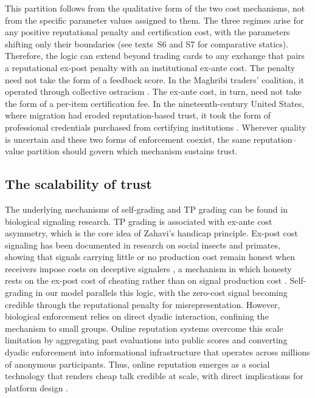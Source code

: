 \documentclass[11pt,letterpaper]{article}
\theoremstyle{definition}
\begin{document}
This partition follows from the qualitative form of the two cost mechanisms, not from the specific parameter values assigned to them. The three regimes arise for any positive reputational penalty and certification cost, with the parameters shifting only their boundaries (see texts~S6 and S7 for comparative statics). Therefore, the logic can extend beyond trading cards to any exchange that pairs a reputational ex-post penalty with an institutional ex-ante cost. The penalty need not take the form of a feedback score. In the Maghribi traders' coalition, it operated through collective ostracism \citep{Greif1993, Greif1994}. The ex-ante cost, in turn, need not take the form of a per-item certification fee. In the nineteenth-century United States, where migration had eroded reputation-based trust, it took the form of professional credentials purchased from certifying institutions \citep{Zucker1986}. Wherever quality is uncertain and these two forms of enforcement coexist, the same reputation--value partition should govern which mechanism sustains trust.

\subsection*{The scalability of trust}

The underlying mechanisms of self-grading and TP grading can be found in biological signaling research. TP grading is associated with ex-ante cost asymmetry, which is the core idea of Zahavi's \cite{Zahavi1975} handicap principle. Ex-post cost signaling has been documented in research on social insects and primates, showing that signals carrying little or no production cost remain honest when receivers impose costs on deceptive signalers \citep{TibbettsDale2004, Silk2000, TibbettsIzzo2010}, a mechanism in which honesty rests on the ex-post cost of cheating rather than on signal production cost \citep{Hurd1995, Lachmann2001, Szamado2011}. Self-grading in our model parallels this logic, with the zero-cost signal becoming credible through the reputational penalty for misrepresentation. However, biological enforcement relies on direct dyadic interaction, confining the mechanism to small groups. Online reputation systems overcome this scale limitation by aggregating past evaluations into public scores and converting dyadic enforcement into informational infrastructure that operates across millions of anonymous participants. Thus, online reputation emerges as a social technology that renders cheap talk credible at scale, with direct implications for platform design \citep{Tchernichovski2019}.
\end{document}

